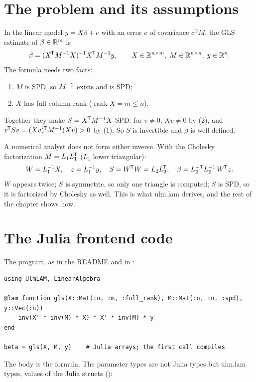 \section{The problem and its assumptions}
\label{sec:gls-problem}

In the linear model \(y = X\beta + e\) with an error \(e\) of covariance
\(\sigma^2 M\), the GLS estimate of \(\beta\in\mathbb{R}^m\) is
\[
  \beta = (X^{\mkern-1.5mu\mathsf{T}} M^{-1} X)^{-1} X^{\mkern-1.5mu\mathsf{T}} M^{-1} y,
  \qquad X\in\mathbb{R}^{n\times m},\; M\in\mathbb{R}^{n\times n},\; y\in\mathbb{R}^n .
\]
The formula needs two facts:
\begin{enumerate}
\item \(M\) is SPD, so \(M^{-1}\) exists and is SPD;
\item \(X\) has full column rank (\(\operatorname{rank} X = m \le n\)).
\end{enumerate}
Together they make \(S = X^{\mkern-1.5mu\mathsf{T}} M^{-1} X\) SPD: for \(v \ne 0\), \(Xv \ne 0\)
by (2), and \(v^{\mkern-1.5mu\mathsf{T}} S v = (Xv)^{\mkern-1.5mu\mathsf{T}} M^{-1} (Xv) > 0\) by (1). So \(S\) is
invertible and \(\beta\) is well defined.

A numerical analyst does not form either inverse. With the Cholesky
factorization \(M = L_1 L_1^{\mkern-1.5mu\mathsf{T}}\) (\(L_1\) lower triangular):
\[
  W = L_1^{-1} X,\quad z = L_1^{-1} y,\quad S = W^{\mkern-1.5mu\mathsf{T}} W = L_2 L_2^{\mkern-1.5mu\mathsf{T}},\quad
  \beta = L_2^{-\mathsf{T}} L_2^{-1}\, W^{\mkern-1.5mu\mathsf{T}} z .
\]
\(W\) appears twice; \(S\) is symmetric, so only one triangle is computed;
\(S\) is SPD, so it is factorized by Cholesky as well. This is what ulm.lam
derives, and the rest of the chapter shows how.

\section{The Julia frontend code}
\label{sec:gls-julia}

The program, as in the README and in :

\begin{lstlisting}[style=jl]
using UlmLAM, LinearAlgebra

@lam function gls(X::Mat(:n, :m, :full_rank), M::Mat(:n, :n, :spd), y::Vec(:n))
    inv(X' * inv(M) * X) * X' * inv(M) * y
end

beta = gls(X, M, y)    # Julia arrays; the first call compiles
\end{lstlisting}

The body is the formula. The parameter types are not Julia types but
ulm.lam types, values of the Julia structs 
():

